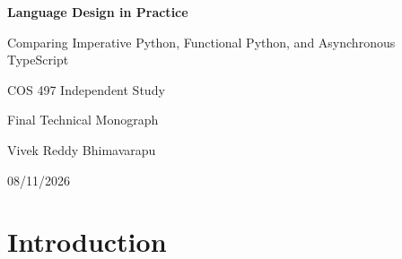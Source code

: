 \documentclass[12pt]{article}
\begin{document}
\begin{titlepage}
\centering
\vspace*{1.5in}
{\LARGE\bfseries Language Design in Practice\par}
\vspace{0.25in}
{\Large Comparing Imperative Python, Functional Python, and Asynchronous TypeScript\par}
\vfill
{\large COS 497 Independent Study\par}
\vspace{0.15in}
{\large Final Technical Monograph\par}
\vfill
{\large Vivek Reddy Bhimavarapu\par}
{\large 08/11/2026\par}
\end{titlepage}
\setcounter{page}{1}
\begin{abstract}

Programming paradigms do not eliminate complexity, instead they determine where it appears and which tools programmers use to control it. This paper compares imperative Python, strictly functional Python, and asynchronous TypeScript through memory management, type safety, and concurrent execution. The comparison is grounded in two implementation artifacts: a Python lexer and recursive-descent expression parser, and a portfolio of Python functions written without loops, comprehensions, mutation, or variable reassignment. The parser shows how formal grammar rules determine precedence, associativity, error handling, and abstract syntax tree structure. The functional portfolio shows how immutability, recursion, and higher-order functions improve local reasoning while sometimes increasing allocation, stack use, and syntactic density. TypeScript adds compile-time checking to JavaScript but erases types before runtime, while its promise-based asynchronous model provides concurrency without automatically providing parallel CPU execution. The analysis finds that imperative Python is generally the clearest choice for direct stateful algorithms, functional techniques are strongest where predictable transformations and reduced shared state matter, and asynchronous TypeScript is especially effective for typed coordination of I/O bound work. A practical design should therefore select and combine paradigms according to the dominant risks of the problem rather than treating any paradigm as universally superior.


\end{abstract}
\section{Introduction}
\end{document}
